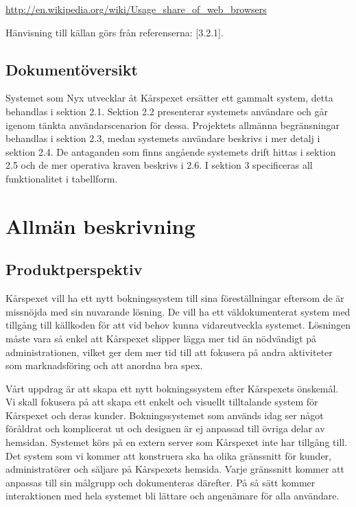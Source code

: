 \documentclass[a4paper, twoside, 11pt, titlepage]{article}
\begin{document}
		\url{http://en.wikipedia.org/wiki/Usage_share_of_web_browsers}

		Hänvisning till källan görs från referenserna: [3.2.1].

	\subsection{Dokumentöversikt}


	Systemet som Nyx utvecklar åt Kårspexet ersätter ett gammalt system, detta behandlas i sektion 2.1. Sektion 2.2 presenterar systemets användare och går igenom tänkta användarscenarion för dessa. Projektets allmänna begränsningar behandlas i sektion 2.3, medan systemets användare beskrivs i mer detalj i sektion 2.4. De antaganden som finns angående systemets drift hittas i sektion 2.5 och de mer operativa kraven beskrivs i 2.6. I sektion 3 specificeras all funktionalitet i tabellform.

\clearpage
\section{Allmän beskrivning}



	\subsection{Produktperspektiv}


	Kårspexet vill ha ett nytt bokningssystem till sina föreställningar eftersom de är missnöjda med sin nuvarande lösning. De vill ha ett väldokumenterat system med tillgång till källkoden för att vid behov kunna vidareutveckla systemet. Lösningen måste vara så enkel att Kårspexet slipper lägga mer tid än nödvändigt på administrationen, vilket ger dem mer tid till att fokusera på andra aktiviteter som marknadsföring och att anordna bra spex.

	Vårt uppdrag är att skapa ett nytt bokningssystem efter Kårspexets önskemål. Vi skall fokusera på att skapa ett enkelt och visuellt tilltalande system för Kårspexet och deras kunder. Bokningssystemet som används idag ser något föråldrat och komplicerat ut och designen är ej anpassad till övriga delar av hemsidan. Systemet körs på en extern server som Kårspexet inte har tillgång till. Det system som vi kommer att konstruera ska ha olika gränssnitt för kunder, administratörer och säljare på Kårspexets hemsida. Varje gränssnitt kommer att anpassas till sin målgrupp och dokumenteras därefter. På så sätt kommer interaktionen med hela systemet bli lättare och angenämare för alla användare.
\end{document}
